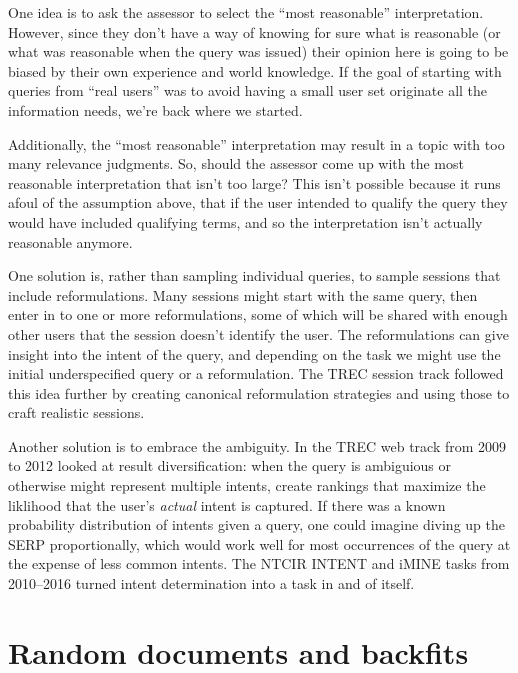 \documentclass[nobib]{tufte-book}
\begin{document}
One idea is to ask the assessor to select the ``most reasonable'' interpretation.  However, since they don't have a way of knowing for sure what is reasonable (or what was reasonable when the query was issued) their opinion here is going to be biased by their own experience and world knowledge.  If the goal of starting with queries from ``real users'' was to avoid having a small user set originate all the information needs, we're back where we started.

Additionally, the ``most reasonable'' interpretation may result in a topic with too many relevance judgments.  So, should the assessor come up with the most reasonable interpretation that isn't too large?  This isn't possible because it runs afoul of the assumption above, that if the user intended to qualify the query they would have included qualifying terms, and so the interpretation isn't actually reasonable anymore.

One solution is, rather than sampling individual queries, to sample sessions that include reformulations.  Many sessions might start with the same query, then enter in to one or more reformulations, some of which will be shared with enough other users that the session doesn't identify the user.  The reformulations can give insight into the intent of the query, and depending on the task we might use the initial underspecified query or a reformulation.  The TREC session track followed this idea further by creating canonical reformulation strategies and using those to craft realistic sessions.

Another solution is to embrace the ambiguity.  In the TREC web track from 2009 to 2012\autocite{trec-web-2009,trec-web-2010,trec-web-2011,trec-web-2012} looked at result diversification: when the query is ambiguious or otherwise might represent multiple intents, create rankings that maximize the liklihood that the user's {\em actual} intent is captured.  If there was a known probability distribution of intents given a query, one could imagine diving up the SERP proportionally, which would work well for most occurrences of the query at the expense of less common intents.  The NTCIR INTENT\autocite{intent-1,intent-2} and iMINE\autocite{imine-1,imine-2} tasks from 2010--2016 turned intent determination into a task in and of itself.

\section{Random documents and backfits}
\end{document}

